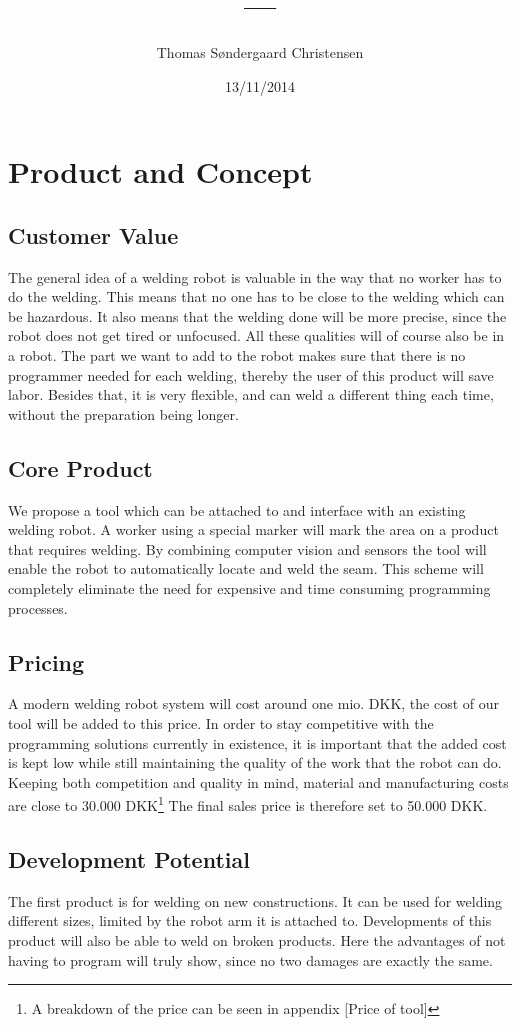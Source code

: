 \documentclass[11pt,a4paper]{article}
\author{Thomas Søndergaard Christensen}
\title{---}
\date{13/11/2014}
\begin{document}
\section{Product and Concept}
\subsection{Customer Value}
The general idea of a welding robot is valuable in the way that no worker has to do the welding. This means that no one has to be close to the welding which can be hazardous. It also means that the welding done will be more precise, since the robot does not get tired or unfocused. All these qualities will of course also be in a robot. The part we want to add to the robot  makes sure that there is no programmer needed for each welding, thereby the user of this product will save labor. Besides that, it is very flexible, and can weld a different thing each time, without the preparation being longer.
\subsection{Core Product}
We propose a tool which can be attached to and interface with an existing welding robot. 
A worker using a special marker will mark the area on a product that requires welding. By combining computer vision and sensors the tool will enable the robot to automatically locate and weld the seam. This scheme will completely eliminate the need for expensive and time consuming programming processes.

\subsection{Pricing}
A modern welding robot system will cost around one mio. DKK, the cost of our tool will be added to this price. In order to stay competitive with the programming solutions currently in existence, it is important that the added cost is kept low while still maintaining the quality of the work that the robot can do. Keeping both competition and quality in mind, material and manufacturing costs are close to 30.000 DKK\footnote{A breakdown of the price can be seen in appendix [Price of tool]} The final sales price is therefore set to 50.000 DKK.
\subsection{Development Potential}
The first product is for welding on new constructions. It can be used for welding different sizes, limited by the robot arm it is attached to. Developments of this product will also be able to weld on broken products. Here the advantages of not having to program will truly show, since no two damages are exactly the same.
\end{document}
